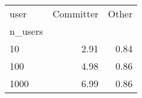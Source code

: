 \begin{tabular}{lrr}
\toprule
user & Committer & Other \\
n_users &  &  \\
\midrule
10 & 2.91 & 0.84 \\
100 & 4.98 & 0.86 \\
1000 & 6.99 & 0.86 \\
\bottomrule
\end{tabular}
